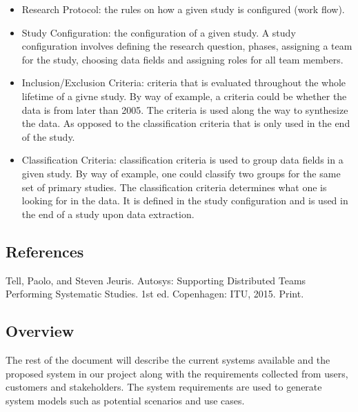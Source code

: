 \begin{itemize}
	  \item Research Protocol: the rules on how a given study is configured (work flow).
	  \item Study Configuration: the configuration of a given study. A study configuration involves defining the research question, phases, assigning a team for the study, choosing data fields and assigning roles for all team members. 
	  \item Inclusion/Exclusion Criteria: criteria that is evaluated throughout the whole lifetime of a givne study. By way of example, a criteria could be whether the data is from later than 2005. The criteria is used along the way to synthesize the data. As opposed to the classification criteria that is only used in the end of the study. 
	  \item Classification Criteria: classification criteria is used to group data fields in a given study. By way of example, one could classify two groups for the same set of primary studies. The classification criteria determines what one is looking for in the data. It is defined in the study configuration and is used in the end of a study upon data extraction. 
	\end{itemize}
	
\subsection{References}
Tell, Paolo, and Steven Jeuris. Autosys: Supporting Distributed Teams Performing Systematic Studies. 1st ed. Copenhagen: ITU, 2015. Print.

\subsection{Overview}
The rest of the document will describe the current systems available and the proposed system in our project along with the requirements collected from users, customers and stakeholders. The system requirements are used to generate system models such as potential scenarios and use cases. 
